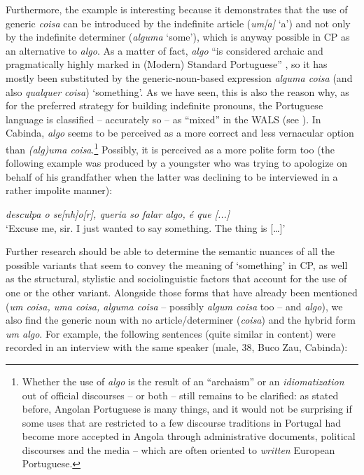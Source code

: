 \documentclass[output=paper,colorlinks,citecolor=brown]{langscibook}
\begin{document}
Furthermore, the example is interesting because it demonstrates that the use of generic \textit{coisa} can be introduced by the indefinite article (\textit{um[a]} ‘a’) and not only by the indefinite determiner (\textit{alguma} ‘some’), which is anyway possible in CP as an alternative to \textit{algo}. As a matter of fact, \textit{algo} “is considered archaic and pragmatically highly marked in (Modern) Standard Portuguese” \citep[][ft. 21]{Cardoso2013}, so it has mostly been substituted by the generic-noun-based expression \textit{alguma coisa} (and also \textit{qualquer coisa}) ‘something’. As we have seen, this is also the reason why, as for the preferred strategy for building indefinite pronouns, the Portuguese language is classified -- accurately so -- as “mixed” in the WALS (see ). In Cabinda, \textit{algo} seems to be perceived as a more correct and less vernacular option than \textit{(alg)uma coisa}.\footnote{Whether the use of \textit{algo} is the result of an “archaism” or an \textit{idiomatization} \citep[cf.][]{Koch1997} out of official discourses – or both – still remains to be clarified: as stated before, Angolan Portuguese is many things, and it would not be surprising if some uses that are restricted to a few discourse traditions in Portugal had become more accepted in Angola through administrative documents, political discourses and the media -- which are often oriented to \textit{written} European Portuguese.} Possibly, it is perceived as a more polite form too (the following example was produced by a youngster who was trying to apologize on behalf of his grandfather when the latter was declining to be interviewed in a rather impolite manner):

\ea \label{ex:gut40}
    \textit{desculpa o se[nh]o[r], queria so falar algo, é que [...]}\\
    ‘Excuse me, sir. I just wanted to say something. The thing is […]’
\z

Further research should be able to determine the semantic nuances of all the possible variants that seem to convey the meaning of ‘something’ in CP, as well as the structural, stylistic and sociolinguistic factors that account for the use of one or the other variant. Alongside those forms that have already been mentioned (\textit{um coisa, uma coisa, alguma coisa} -- possibly \textit{algum coisa} too -- and \textit{algo}), we also find the generic noun with no article/determiner (\textit{coisa}) and the hybrid form \textit{um algo}. For example, the following sentences (quite similar in content) were recorded in an interview with the same speaker (male, 38, Buco Zau, Cabinda): 
\end{document}
